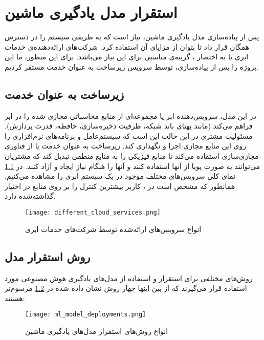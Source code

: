 \chapter{استقرار مدل یادگیری ماشین}

پس از پیاده‌سازی مدل یادگیری ماشین، نیاز است که به طریقی سیستم را در دسترس همگان قرار داد تا بتوان از مزایای آن استفاده کرد. شرکت‌های ارائه‌دهنده‌ی خدمات ابری یا به اختصار ، گزینه‌ی مناسبی برای این نیاز می‌باشد. برای این منظور، ما این پروژه را پس از پیاده‌سازی، توسط سرویس زیرساخت به عنوان خدمت مستقر کردیم.


\section{زیرساخت به عنوان خدمت}
در این مدل، سرویس‌دهنده ابر یا  مجموعه‌ای از منابع محاسباتی مجازی شده را در ابر فراهم می‌کند (مانند پهنای باند شبکه، ظرفیت ذخیره‌سازی، حافظه، قدرت پردازش). مسئولیت مشتری در این حالت این است که سیستم‌عامل و برنامه‌های نرم‌افزاری را روی این منابع مجازی اجرا و نگهداری کند. زیرساخت به عنوان خدمت یا  از فناوری مجازی‌سازی استفاده می‌کند تا منابع فیزیکی را به منابع منطقی تبدیل کند که مشتریان می‌توانند به صورت پویا از آنها استفاده کنند و آنها را هنگام نیاز ایجاد و آزاد کنند\cite{youssef2012exploring}. در \cref{fig:different_cloud_services} نمای کلی سرویس‌های مختلف موجود در یک سیستم ابری را مشاهده می‌کنیم. همانطور که مشخص است در ، کاربر بیشترین کنترل را بر روی منابع در اختیار گذاشته‌شده دارد\cite{serrano2015infrastructure}.



\begin{figure}[!h]
\centerline{\texttt{[image: different\_cloud\_services.png]}}
\caption{انواع سرویس‌های ارائه‌شده توسط شرکت‌های خدمات ابری}
\label{fig:different_cloud_services}
\end{figure}


\section{روش‌ استقرار مدل}
 روش‌های مختلفی برای استقرار و استفاده از مدل‌های یادگیری هوش مصنوعی مورد استفاده قرار می‌گیرند که از بین اینها چهار روش نشان داده‌ شده در \cref{fig:ml_model_deployments} مرسوم‌تر هستند\cite{kaggleMLdeployments}:

\begin{figure}[!h]
\centerline{\texttt{[image: ml\_model\_deployments.png]}}
\caption{انواع روش‌های استقرار مدل‌های یادگیری ماشین}
\label{fig:ml_model_deployments}
\end{figure}

